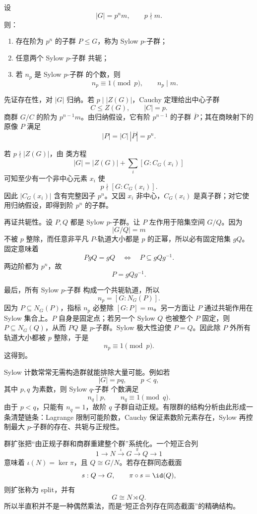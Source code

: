 \begin{theorem}[Sylow 定理]\label{thm:math-group-sylow}
设
\[
|G|=p^n m,
\qquad p\nmid m.
\]
则：
\begin{enumerate}[label=(\roman*)]
\item 存在阶为 $p^n$ 的子群 $P\le G$，称为 Sylow $p$-子群；
\item 任意两个 Sylow $p$-子群 共轭；
\item 若 $n_p$ 是 Sylow $p$-子群 的个数，则
\begin{equation}
\boxed{
n_p\equiv1\pmod p,
\qquad
n_p\mid m.
}
\label{eq:math-group-sylow-count}
\end{equation}
\end{enumerate}
\end{theorem}

先证存在性，对 $|G|$ 归纳。若 $p\mid|Z(G)|$，Cauchy 定理给出中心子群
\[
C\le Z(G),\qquad |C|=p.
\]
商群 $G/C$ 的阶为 $p^{n-1}m$。由归纳假设，它有阶 $p^{n-1}$ 的子群 $\overline P$；其在商映射下的原像 $P$ 满足
\[
|P|=|C|\,|\overline P|=p^n.
\]

若 $p\nmid|Z(G)|$，由 类方程
\[
|G|=|Z(G)|+\sum_i[G:C_G(x_i)]
\]
可知至少有一个非中心元素 $x_i$ 使
\[
p\nmid[G:C_G(x_i)].
\]
因此 $|C_G(x_i)|$ 含有完整因子 $p^n$。又因 $x_i$ 非中心，$C_G(x_i)$ 是真子群；对它使用归纳假设，即得到阶 $p^n$ 的子群。

再证共轭性。设 $P,Q$ 都是 Sylow $p$-子群。让 $P$ 左作用于陪集空间 $G/Q$。因为
\[
|G/Q|=m
\]
不被 $p$ 整除，而任意非平凡 $P$-轨道大小都是 $p$ 的正幂，所以必有固定陪集 $gQ$。固定意味着
\[
PgQ=gQ
\quad\Longleftrightarrow\quad
P\subseteq gQg^{-1}.
\]
两边阶都为 $p^n$，故
\[
P=gQg^{-1}.
\]

最后，所有 Sylow $p$-子群 构成一个共轭轨道，所以
\[
n_p=[G:N_G(P)].
\]
因为 $P\subseteq N_G(P)$，指标 $n_p$ 必整除 $[G:P]=m$。另一方面让 $P$ 通过共轭作用在 Sylow 集合上。$P$ 自身是固定点；若另一个 Sylow $Q$ 也被整个 $P$ 固定，则 $P\subseteq N_G(Q)$，从而 $PQ$ 是 $p$-子群。Sylow 极大性迫使 $P=Q$。因此除 $P$ 外所有轨道大小都被 $p$ 整除，于是
\[
n_p\equiv1\pmod p.
\]
这得到。

Sylow 计数常常无需构造群就能排除大量可能。例如若
\[
|G|=pq,
\qquad p<q,
\]
其中 $p,q$ 为素数，则 Sylow $q$-子群 个数满足
\[
n_q\mid p,
\qquad
n_q\equiv1\pmod q.
\]
由于 $p<q$，只能有 $n_q=1$，故阶 $q$ 子群自动正规。有限群的结构分析由此形成一条清楚链条：Lagrange 限制可能阶数，Cauchy 保证素数阶元素存在，Sylow 再控制最大 $p$-子群的存在、共轭与正规性。

群扩张把“由正规子群和商群重建整个群”系统化。一个短正合列
\begin{equation*}1\longrightarrow N
\xrightarrow{\iota}G
\xrightarrow{\pi}Q
\longrightarrow1\end{equation*}
意味着 $\iota(N)=\ker\pi$，且 $Q\cong G/N$。若存在群同态截面
\[
s:Q\to G,
\qquad
\pi\circ s=\id(Q),
\]
则扩张称为 split，并有
\[
G\cong N\rtimes Q.
\]
所以半直积并不是一种偶然乘法，而是“短正合列存在同态截面”的精确结构。

